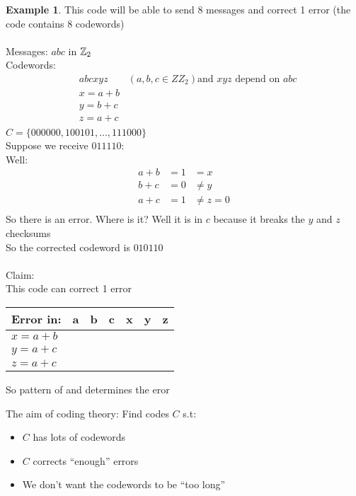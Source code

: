 \documentclass[]{article}
\theoremstyle{definition}
\newtheorem*{exmp}{Example}
\theoremstyle{remark}
\numberwithin{equation}{section}
\begin{document}
	\begin{exmp}
		This code will be able to send 8 messages and correct 1 error (the code contains 8 codewords)\\
		\\
		Messages: $abc$ in $\mathbb{Z}_2$\\
		Codewords:\\
		\begin{align*}
			&abcxyz \qquad (a,b,c \in ZZ_2) \text{and $xyz$ depend on $abc$}\\
			&x = a+b\\
			&y = b+c\\
			&z = a+c\\
		\end{align*}
		$C = \{000 000, 100 101, … , 111 000\}$\\
		Suppose we receive $011 110$:\\
		Well:\\
		\begin{align*}
			a + b &= 1 &= x\\
			b + c &= 0 &\neq y\\
			a + c &= 1 &\neq z = 0\\
		\end{align*}
		So there is an error. Where is it? Well it is in $c$ because it breaks the $y$ and $z$ checksums\\
		So the corrected codeword is $010 110$\\
		\\
		Claim:\\
		This code can correct 1 error\\
		\begin{table}[h]
		\begin{tabular}{lllllll}
		Error in: & \multicolumn{1}{l|}{a} & \multicolumn{1}{l|}{b} & \multicolumn{1}{l|}{c} & \multicolumn{1}{l|}{x} & \multicolumn{1}{l|}{y} & \multicolumn{1}{l|}{z} \\ \hline
		$x=a+b$   & \xmark & \xmark & \cmark & \xmark & \cmark & \cmark  \\
		$y=a+c$   & \cmark & \xmark & \xmark & \cmark & \xmark & \cmark  \\
		$z=a+c$   & \xmark & \cmark & \xmark & \xmark & \cmark & \cmark 
		\end{tabular}
		\end{table}
		So pattern of \cmark and \xmark determines the eror	
	\end{exmp}
	The aim of coding theory: Find codes $C $ s.t:\\
	\begin{itemize}
		\item $C$ has lots of codewords
		\item $C$ corrects “enough” errors
		\item We don’t want the codewords to be “too long”
	\end{itemize}
\end{document}
